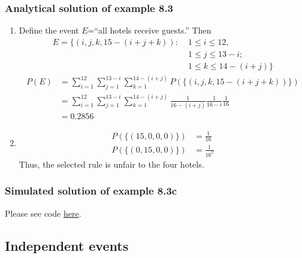 \begin{frame}
    \frametitle{Analytical solution of example 8.3}

    \tiny
    \begin{enumerate}[a]
		\conti
        \item 
			Define the event $E$=``all hotels receive guests.'' Then
    		\begin{align*}
        		E=\{(i,j,k,15-(i+j+k)):\;&1\le i\le 12,\\
                                      	 &1\le j\le 13-i;\\
                                      	 &1\le k\le 14-(i+j)\}
            \end{align*}
    		\begin{align*}
				P(E)&=\sum_{i=1}^{12}\sum_{j=1}^{13-i}\sum_{k=1}^{14-(i+j)}P(\{(i,j,k,15-(i+j+k))\})\\
                    &=\sum_{i=1}^{12}\sum_{j=1}^{13-i}\sum_{k=1}^{14-(i+j)}\frac{1}{16-(i+j)}\frac{1}{16-i}\frac{1}{16}\\
                    &=0.2856
            \end{align*}
        \item
    		\begin{align*}
                P(\{(15,0,0,0)\})&=\frac{1}{16}\\
                P(\{(0,15,0,0)\})&=\frac{1}{16^2}
            \end{align*}
            Thus, the selected rule is unfair to the four hotels.
    \end{enumerate}
    \normalsize

\end{frame}

\begin{frame}[fragile]
    \frametitle{Simulated solution of example 8.3c}

    Please see code \href{https://joacorapela.github.io/gcnuBridging2023/auto_examples/foundations/plot_example8_3.html#sphx-glr-auto-examples-foundations-plot-example8-3-py}{here}.

\end{frame}

\subsection{Independent events}


